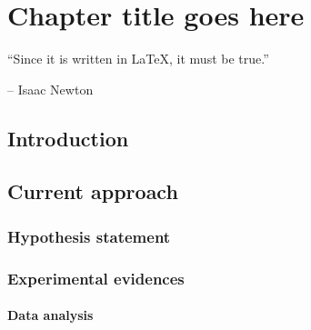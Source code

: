\chapter{Chapter title goes here} \label{chap:chap-3}



\epigraph{\enquote{Since it is written in \LaTeX, it must be true.}}{-- Isaac Newton}




\section{Introduction}
\blindtext


\section{Current approach}
\blindtext

\subsection{Hypothesis statement}
\blindtext


\subsection{Experimental evidences}
\blindtext


\subsubsection{Data analysis}
\blindtext